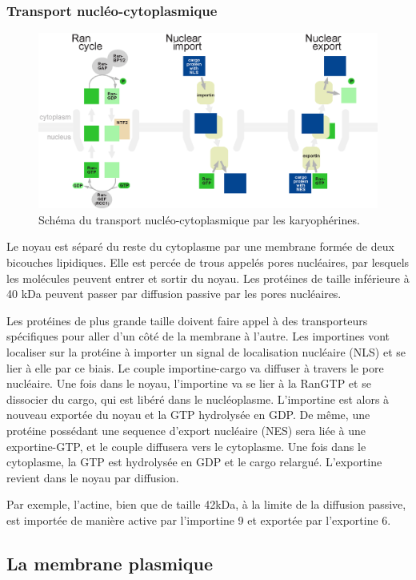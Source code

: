 \subsubsection{Transport nucléo-cytoplasmique}
\begin{figure}
\includegraphics[scale=0.8]{Rancycle_nuclearimport_nuclearexport.png}
\caption{Schéma du transport nucléo-cytoplasmique par les karyophérines.}
\end{figure}
Le noyau est séparé du reste du cytoplasme par une membrane formée de deux bicouches lipidiques. Elle est percée de trous appelés pores nucléaires, par lesquels les molécules peuvent entrer et sortir du noyau. Les protéines de taille inférieure à 40 kDa peuvent passer par diffusion passive par les pores nucléaires. 

Les protéines de plus grande taille doivent faire appel à des transporteurs spécifiques pour aller d'un côté de la membrane à l'autre. 
Les importines vont localiser sur la protéine à importer un signal de localisation nucléaire (NLS) et se lier à elle par ce biais. Le couple importine-cargo va diffuser à travers le pore nucléaire. 
Une fois dans le noyau, l'importine va se lier à la RanGTP et se dissocier du cargo, qui est libéré dans le nucléoplasme. L'importine est alors à nouveau exportée du noyau et la GTP hydrolysée en GDP. 
De même, une protéine possédant une sequence d'export nucléaire (NES) sera liée à une exportine-GTP, et le couple diffusera vers le cytoplasme. Une fois dans le cytoplasme, la GTP est hydrolysée en GDP et le cargo relargué. L'exportine revient dans le noyau par diffusion. 

Par exemple, l'actine, bien que de taille 42kDa, à la limite de la diffusion passive, est importée de manière active par l'importine 9 et exportée par l'exportine 6. 

\subsection{La membrane plasmique}

